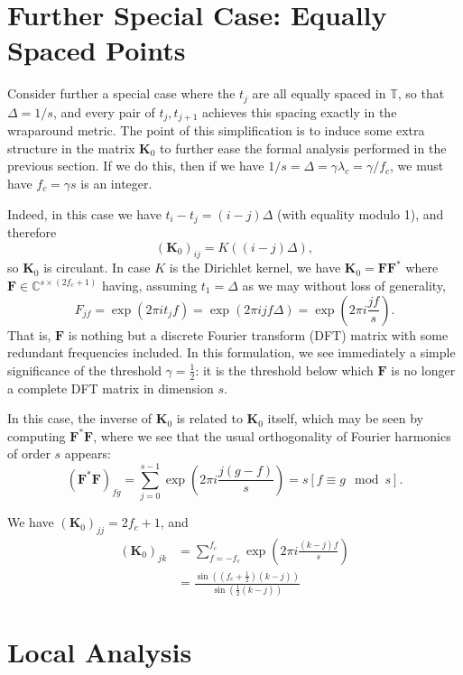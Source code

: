 \documentclass[11pt]{article}
\newcommand{\TT}{\mathbb{T}}
\newcommand{\CC}{\mathbb{C}}
\newcommand{\bF}{\bm F}
\newcommand{\bK}{\bm K}
\begin{document}
\section{Further Special Case: Equally Spaced Points}

Consider further a special case where the $t_j$ are all equally spaced in $\TT$, so that $\Delta = 1/s$, and every pair of $t_j, t_{j + 1}$ achieves this spacing exactly in the wraparound metric.
The point of this simplification is to induce some extra structure in the matrix $\bK_0$ to further ease the formal analysis performed in the previous section.
If we do this, then if we have $1/s = \Delta = \gamma\lambda_c = \gamma / f_c$, we must have $f_c = \gamma s$ is an integer.

Indeed, in this case we have $t_i - t_j = (i - j)\Delta$ (with equality modulo 1), and therefore
\[ (\bK_0)_{ij} = K((i - j)\Delta), \]
so $\bK_0$ is circulant.
In case $K$ is the Dirichlet kernel, we have $\bK_0 = \bF\bF^*$ where $\bF \in \CC^{s \times (2f_c + 1)}$ having, assuming $t_1 = \Delta$ as we may without loss of generality,
\[ F_{jf} = \exp(2\pi i t_j f) = \exp(2\pi i jf\Delta) = \exp\left(2\pi i \frac{jf}{s}\right). \]
That is, $\bF$ is nothing but a discrete Fourier transform (DFT) matrix with some redundant frequencies included.
In this formulation, we see immediately a simple significance of the threshold $\gamma = \frac{1}{2}$: it is the threshold below which $\bF$ is no longer a complete DFT matrix in dimension $s$.

In this case, the inverse of $\bK_0$ is related to $\bK_0$ itself, which may be seen by computing $\bF^*\bF$, where we see that the usual orthogonality of Fourier harmonics of order $s$ appears:
\[ (\bF^*\bF)_{fg} = \sum_{j = 0}^{s - 1}\exp\left(2\pi i \frac{j(g - f)}{s}\right) = s[f \equiv g \mod s]. \]

We have $(\bK_0)_{jj} = 2f_c + 1$, and
\begin{align*}
  (\bK_0)_{jk}
  &= \sum_{f = -f_c}^{f_c}\exp\left(2\pi i \frac{(k - j)f}{s}\right) \\
  &= \frac{\sin((f_c + \frac{1}{2})(k - j))}{\sin(\frac{1}{2}(k - j))}
\end{align*}

\section{Local Analysis}
\end{document}
